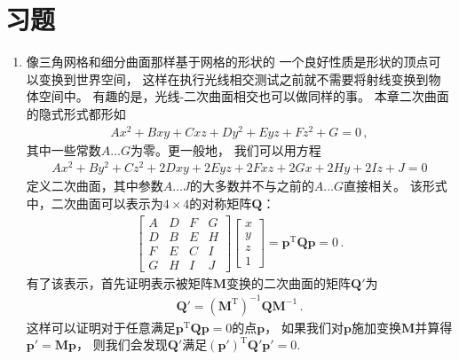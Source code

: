 \section{习题}\label{sec:习题03}

\begin{enumerate}
    \item \circletwo 像三角网格和细分曲面那样基于网格的形状的
          一个良好性质是形状的顶点可以变换到世界空间，
          这样在执行光线相交测试之前就不需要将射线变换到物体空间中。
          有趣的是，光线-二次曲面相交也可以做同样的事。
          本章二次曲面的隐式形式都形如
          \begin{align*}
              Ax^2+Bxy+Cxz+Dy^2+Eyz+Fz^2+G=0\, ,
          \end{align*}
          其中一些常数$A\ldots G$为零。更一般地，
          我们可以用方程
          \begin{align*}
              Ax^2+By^2+Cz^2+2Dxy+2Eyz+2Fxz+2Gx+2Hy+2Iz+J=0
          \end{align*}
          定义二次曲面，其中参数$A\ldots J$的大多数并不与之前的$A\ldots G$直接相关。
          该形式中，二次曲面可以表示为$4\times4$的对称矩阵$\bm Q$：
          \begin{align*}
              [x\ y\ z\ 1]\left[
                  \begin{array}{cccc}
                      A & D & F & G \\
                      D & B & E & H \\
                      F & E & C & I \\
                      G & H & I & J
                  \end{array}
                  \right]\left[\begin{array}{c}
                      x \\y\\z\\1
                  \end{array}\right]=\bm p^{\mathrm{T}}\bm Q\bm p=0\, .
          \end{align*}
          有了该表示，首先证明表示被矩阵$\bm M$变换的二次曲面的矩阵$\bm Q'$为
          \begin{align*}
              \bm Q'=(\bm M^{\mathrm{T}})^{-1}\bm Q\bm M^{-1}\, .
          \end{align*}
          这样可以证明对于任意满足$\bm p^{\mathrm{T}}\bm Q\bm p=0$的点$\bm p$，
          如果我们对$\bm p$施加变换$\bm M$并算得$\bm p'=\bm M\bm p$，
          则我们会发现$\bm Q'$满足$(\bm p')^{\mathrm{T}}\bm Q'\bm p'=0$.

\end{enumerate}
